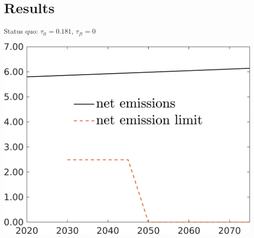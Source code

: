 \documentclass[11pt,aspectratio=169]{beamer}
\begin{document}
\section{Results}
\begin{frame}{Status quo: $\tau_{lt}=0.181$, $\tau_{ft}=0$}
	\hypertarget{sq}{}
	\centering
	\begin{minipage}[]{0.4\textwidth}
		\includegraphics[width=1\textwidth]{../codding_model/own_basedOnFried/optimalPol_elastS_DisuSci/figures/all_1705/Single_BAU_Emnet_spillover0_sep1_BN0_ineq0_red0_etaa0.79.png}
	\end{minipage}
	
\end{frame}

\end{document}
